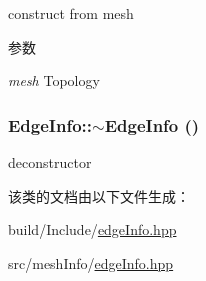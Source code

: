 construct from mesh 
\begin{DoxyParams}{参数}
\item[{\em mesh}]Topology \end{DoxyParams}
\hypertarget{classEdgeInfo_ac1563ffa6c9641e5510503aa2e46f7a1}{
\subsubsection[{$\sim$EdgeInfo}]{\setlength{\rightskip}{0pt plus 5cm}EdgeInfo::$\sim$EdgeInfo ()}}
\label{classEdgeInfo_ac1563ffa6c9641e5510503aa2e46f7a1}


deconstructor 

该类的文档由以下文件生成：\begin{DoxyCompactItemize}
\item 
build/Include/\hyperlink{build_2Include_2edgeInfo_8hpp}{edgeInfo.hpp}\item 
src/meshInfo/\hyperlink{src_2meshInfo_2edgeInfo_8hpp}{edgeInfo.hpp}\end{DoxyCompactItemize}
